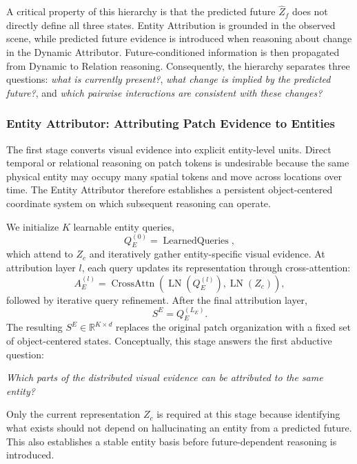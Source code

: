 \documentclass{article}
\begin{document}
A critical property of this hierarchy is that the predicted future $\widehat{Z}_f$ does not directly define all three states. Entity Attribution is grounded in the observed scene, while predicted future evidence is introduced when reasoning about change in the Dynamic Attributor. Future-conditioned information is then propagated from Dynamic to Relation reasoning. Consequently, the hierarchy separates three questions: \emph{what is currently present?}, \emph{what change is implied by the predicted future?}, and \emph{which pairwise interactions are consistent with these changes?}

\subsubsection{Entity Attributor: Attributing Patch Evidence to Entities}
The first stage converts visual evidence into explicit entity-level units. Direct temporal or relational reasoning on patch tokens is undesirable because the same physical entity may occupy many spatial tokens and move across locations over time. The Entity Attributor therefore establishes a persistent object-centered coordinate system on which subsequent reasoning can operate.

We initialize $K$ learnable entity queries,
\begin{equation}
    Q_E^{(0)}
    =
    \operatorname{LearnedQueries},
\end{equation}
which attend to $Z_c$ and iteratively gather entity-specific visual evidence. At attribution layer $l$, each query updates its representation through cross-attention:
\begin{equation}
    A_E^{(l)}
    =
    \operatorname{CrossAttn}
    \left(
    \operatorname{LN}(Q_E^{(l)}),
    \operatorname{LN}(Z_c)
    \right),
\end{equation}
followed by iterative query refinement. After the final attribution layer,
\begin{equation}
    S^E = Q_E^{(L_E)}.
    \label{eq:entity-main}
\end{equation}
The resulting $S^E\in\mathbb{R}^{K\times d}$ replaces the original patch organization with a fixed set of object-centered states. Conceptually, this stage answers the first abductive question:
\begin{center}
    \emph{Which parts of the distributed visual evidence can be attributed to the same entity?}
\end{center}
Only the current representation $Z_c$ is required at this stage because identifying what exists should not depend on hallucinating an entity from a predicted future. This also establishes a stable entity basis before future-dependent reasoning is introduced.
\end{document}
